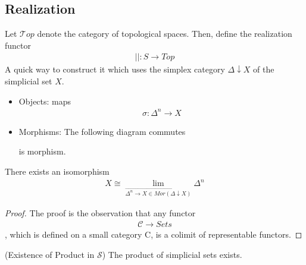 \documentclass[Total.tex]{subfiles}
\begin{document}
			\subsection{Realization}
			\begin{Def}
				Let $\mathcal Top$ denote the category of topological spaces. Then, define the realization functor
				\begin{gather*}
					||:S\rightarrow Top
				\end{gather*}
				A quick way to construct it which uses the simplex category $\Delta\downarrow X$ of the simplicial set $X$. 
				\begin{itemize}
					\item Objects: maps
					\begin{gather*}
						\sigma:\Delta^n\rightarrow X
					\end{gather*}
					\item Morphisms: The following diagram commutes
					\begin{center}
					\end{center}
					is morphism.
				\end{itemize}
			\end{Def}
			
			\begin{lemma}
				There exists an isomorphism
				\begin{gather*}
					X\cong \lim_{\stackrel{\rightarrow}{\Delta^n\rightarrow X\in Mor(\Delta\downarrow X)}} \Delta^n
				\end{gather*}
			\end{lemma}
			\begin{proof}
				The proof is the observation that any functor 
				\begin{gather*}
					\mathcal{C}\rightarrow Sets
				\end{gather*}
				, which is
				defined on a small category C, is a colimit of representable functors.
			\end{proof}
			
			\begin{corollary}
				(Existence of Product in $\mathcal{S}$) The product of simplicial sets exists.
			\end{corollary}
			
\end{document}
